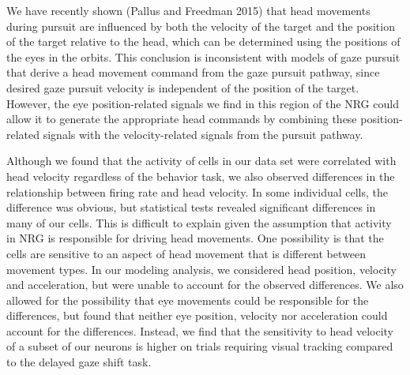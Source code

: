 \documentclass[]{article}
\begin{document}
We have recently shown (Pallus and Freedman 2015) that head movements
during pursuit are influenced by both the velocity of the target and the
position of the target relative to the head, which can be determined
using the positions of the eyes in the orbits. This conclusion is
inconsistent with models of gaze pursuit that derive a head movement
command from the gaze pursuit pathway, since desired gaze pursuit
velocity is independent of the position of the target. However, the eye
position-related signals we find in this region of the NRG could allow
it to generate the appropriate head commands by combining these
position-related signals with the velocity-related signals from the
pursuit pathway.

Although we found that the activity of cells in our data set were
correlated with head velocity regardless of the behavior task, we also
observed differences in the relationship between firing rate and head
velocity. In some individual cells, the difference was obvious, but
statistical tests revealed significant differences in many of our cells.
This is difficult to explain given the assumption that activity in NRG
is responsible for driving head movements. One possibility is that the
cells are sensitive to an aspect of head movement that is different
between movement types. In our modeling analysis, we considered head
position, velocity and acceleration, but were unable to account for the
observed differences. We also allowed for the possibility that eye
movements could be responsible for the differences, but found that
neither eye position, velocity nor acceleration could account for the
differences. Instead, we find that the sensitivity to head velocity of a
subset of our neurons is higher on trials requiring visual tracking
compared to the delayed gaze shift task.
\end{document}
